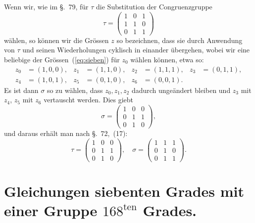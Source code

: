 \documentclass[12pt,a4paper]{article}
\begin{document}
Wenn wir, wie im \S.~79, f\"ur $\tau$ die Substitution der Congruenzgruppe
\begin{equation}
\label{eq:taucong} \tau = \begin{pmatrix} 1 & 0 & 1 \\ 1 & 1 & 0 \\ 0 & 1 & 1 \end{pmatrix}
\end{equation}
w\"ahlen, so k\"onnen wir die Gr\"ossen $z$ so bezeichnen, dass sie durch Anwendung von $\tau$ und seinen Wiederholungen cyklisch in einander \"ubergehen, wobei wir eine beliebige der Gr\"ossen~(\ref{eq:sieben}) f\"ur $z_0$ w\"ahlen k\"onnen, etwa so:
\begin{equation}
\label{eq:zchoice} \begin{aligned} z_0 &= (1, 0, 0), & z_1 &= (1, 1, 0), & z_2 &= (1, 1, 1), & z_3 &= (0, 1, 1),\\ z_4 &= (1, 0, 1), & z_5 &= (0, 1, 0), & z_6 &= (0, 0, 1). \end{aligned}
\end{equation}
Es ist dann $\sigma$ so zu w\"ahlen, dass $z_0, z_1, z_2$ dadurch unge\"andert bleiben und $z_3$ mit $z_4$, $z_5$ mit $z_6$ vertauscht werden. Dies giebt
\begin{equation}
\label{eq:sigmacong} \sigma = \begin{pmatrix} 1 & 0 & 0 \\ 0 & 1 & 1 \\ 0 & 1 & 0 \end{pmatrix},
\end{equation}
und daraus erh\"alt man nach \S.~72,~(17):
\begin{equation}
\label{eq:tausigcong} \tau = \begin{pmatrix} 1 & 0 & 0 \\ 0 & 1 & 1 \\ 0 & 1 & 0 \end{pmatrix}, \quad \sigma = \begin{pmatrix} 1 & 1 & 1 \\ 0 & 1 & 0 \\ 0 & 1 & 1 \end{pmatrix}.
\end{equation}


\newpage
\section{Gleichungen siebenten Grades mit einer Gruppe $168^{\text{ten}}$ Grades.}
\label{sec:128}
\end{document}
